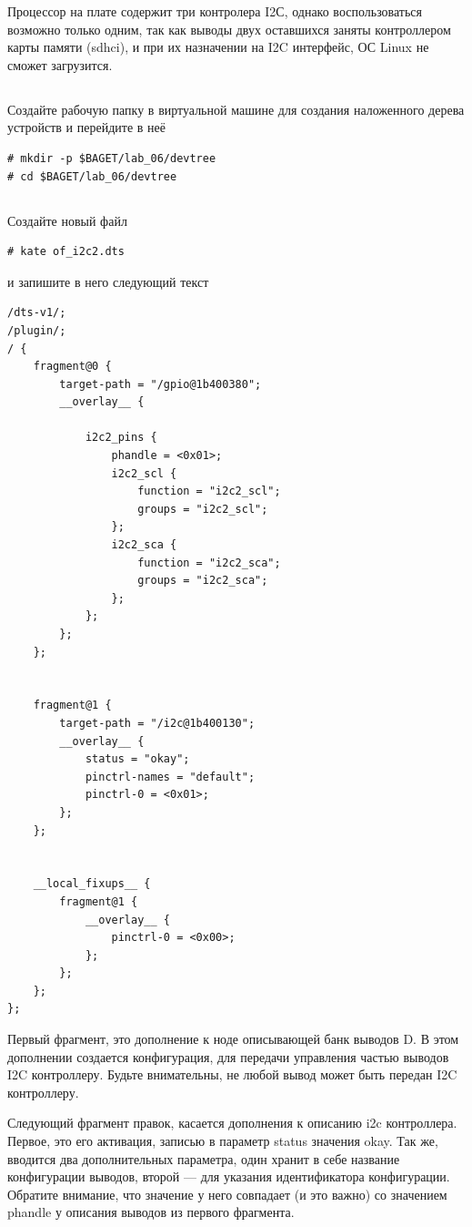 Процессор на плате содержит три контролера I2С, однако воспользоваться возможно только одним, так как выводы двух оставшихся заняты контроллером карты памяти (sdhci), и при их назначении на I2C интерфейс, ОС Linux не сможет загрузится.

\subsection{} Создайте рабочую папку в виртуальной машине для создания наложенного дерева устройств и перейдите в неё 
\begin{lstlisting}[style=bash]
# mkdir -p $BAGET/lab_06/devtree
# cd $BAGET/lab_06/devtree 
\end{lstlisting}

\subsection{} Создайте новый файл
\begin{lstlisting}[style=bash]
# kate of_i2c2.dts
\end{lstlisting}
и запишите в него следующий текст
\begin{lstlisting}[style=stdout]
/dts-v1/;
/plugin/;
/ {
	fragment@0 {
		target-path = "/gpio@1b400380";
		__overlay__ {
			
			i2c2_pins {
				phandle = <0x01>;
				i2c2_scl {
					function = "i2c2_scl";
					groups = "i2c2_scl";
				};
				i2c2_sca {
					function = "i2c2_sca";
					groups = "i2c2_sca";
				};
			};
		};
	};
	
	
	fragment@1 { 
		target-path = "/i2c@1b400130"; 
		__overlay__ { 
			status = "okay"; 
			pinctrl-names = "default"; 
			pinctrl-0 = <0x01>; 
		}; 
	}; 
	
	
	__local_fixups__ {
		fragment@1 {
			__overlay__ {
				pinctrl-0 = <0x00>;
			};
		};	
	};
};
\end{lstlisting}

Первый фрагмент, это дополнение к ноде описывающей банк выводов D. В этом дополнении создается конфигурация, для передачи управления частью выводов I2C контроллеру. Будьте внимательны, не любой вывод может быть передан I2C контроллеру. 

Следующий фрагмент правок, касается дополнения к описанию i2c контроллера. Первое, это его активация, записью в параметр status значения okay. Так же, вводится два дополнительных параметра, один хранит в себе название конфигурации выводов, второй — для указания идентификатора конфигурации. Обратите внимание, что значение у него совпадает (и это важно) со значением phandle у описания выводов из первого фрагмента.

